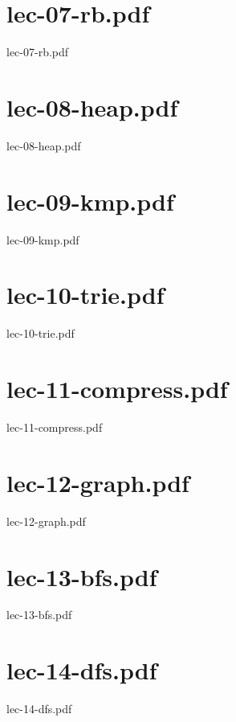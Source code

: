 \documentclass[aspectratio = 169]{beamer}
\begin{document}
\section{lec-07-rb.pdf}
\begin{frame}{lec-07-rb.pdf}
\end{frame}

\section{lec-08-heap.pdf}
\begin{frame}{lec-08-heap.pdf}
\end{frame}

\section{lec-09-kmp.pdf}
\begin{frame}{lec-09-kmp.pdf}
\end{frame}

\section{lec-10-trie.pdf}
\begin{frame}{lec-10-trie.pdf}
\end{frame}

\section{lec-11-compress.pdf}
\begin{frame}{lec-11-compress.pdf}
\end{frame}

\section{lec-12-graph.pdf}
\begin{frame}{lec-12-graph.pdf}
\end{frame}

\section{lec-13-bfs.pdf}
\begin{frame}{lec-13-bfs.pdf}
\end{frame}

\section{lec-14-dfs.pdf}
\begin{frame}{lec-14-dfs.pdf}
\end{frame}

\end{document}
